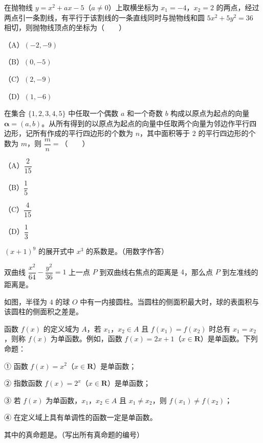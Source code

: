\begin{question}
在抛物线 $y=x^2+ax-5$（$a\neq0$）上取横坐标为 $x_1=-4$，$x_2=2$ 的两点，经过两点引一条割线，有平行于该割线的一条直线同时与抛物线和圆 $5x^2+5y^2=36$ 相切，则抛物线顶点的坐标为\mbox{（　　）}

（A）$(-2,-9)$

（B）$(0,-5)$

（C）$(2,-9)$

（D）$(1,-6)$

\end{question}
\begin{question}
在集合 $\{1,2,3,4,5\}$ 中任取一个偶数 $a$ 和一个奇数 $b$ 构成以原点为起点的向量 $\boldsymbol\alpha=(a,b)$。从所有得到的以原点为起点的向量中任取两个向量为邻边作平行四边形，记所有作成的平行四边形的个数为 $n$，其中面积等于 $2$ 的平行四边形的个数为 $m$，则 $\dfrac mn=$\mbox{（　　）}

（A）$\dfrac{2}{15}$

（B）$\dfrac15$

（C）$\dfrac{4}{15}$

（D）$\dfrac13$

\end{question}

\begin{question}
$(x+1)^9$ 的展开式中 $x^3$ 的系数是\gkblank{}。（用数字作答）

\end{question}
\begin{question}
双曲线 $\dfrac{x^2}{64}-\dfrac{y^2}{36}=1$ 上一点 $P$ 到双曲线右焦点的距离是 $4$，那么点 $P$ 到左准线的距离是\gkblank{}。

\Needspace{0.4\textheight}
\end{question}
\begin{question}
如图，半径为 $4$ 的球 $O$ 中有一内接圆柱。当圆柱的侧面积最大时，球的表面积与该圆柱的侧面积之差是\gkblank{}。
\nopagebreak[4]
\begin{center}\end{center}
\nopagebreak[4]
\end{question}
\begin{question}
函数 $f(x)$ 的定义域为 $A$，若 $x_1$，$x_2\in A$ 且 $f(x_1)=f(x_2)$ 时总有 $x_1=x_2$，则称 $f(x)$ 为单函数。例如，函数 $f(x)=2x+1$（$x\in\mathbf R$）是单函数。下列命题：

① 函数 $f(x)=x^2$（$x\in\mathbf R$）是单函数；

② 指数函数 $f(x)=2^x$（$x\in\mathbf R$）是单函数；

③ 若 $f(x)$ 为单函数，$x_1$，$x_2\in A$ 且 $x_1\neq x_2$，则 $f(x_1)\neq f(x_2)$；

④ 在定义域上具有单调性的函数一定是单函数。

其中的真命题是\gkblank{}。（写出所有真命题的编号）

\end{question}


